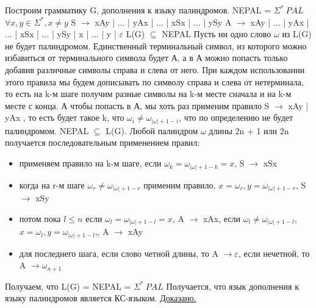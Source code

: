 \documentclass[a4paper,14pt]{article} %
\begin{document}
Построим грамматику G, дополнения к языку палиндромов. NEPAL = $\Sigma^* \ PAL$
$\forall x, y \in \Sigma^*, x \neq y$
\newline
S $\longrightarrow$ xAy | ... | yAx | ... | xSx | ... | ySy
\newline
A $\longrightarrow$ xAy | ... | yAx | ... | xSx | ... | ySy | x | ... | y | $\varepsilon$
\newline
L(G) $\subseteq$ NEPAL
Пусть ни одно слово $\omega$ из L(G) не будет палиндромом. Единственный терминальный символ, из которого можно избавиться от терминального символа будет А, а в А можно попасть только добавив различные символы справа и слева от него.
При каждом использовании этого правила мы будем дописывать по символу справа и слева от нетерминала, то есть на k-м шаге получим разные символы на k-м месте сначала и на k-м месте с конца.
А чтобы попасть в А, мы хоть раз применим правило S $\longrightarrow$ xAy | yAx , то есть будет такое k, что $\omega_i \neq \omega_{|\omega| + 1 - i}$, что по определению не будет палиндромом.
\newline
NEPAL $\subseteq$ L(G).
\newline 
Любой палиндром $\omega$ длины 2n + 1 или 2n получается последовательным применением правил:
\begin{itemize}
    \item применяем правило на k-м шаге, если $\omega_k = \omega_{|\omega| + 1 - k} = x$, S $\longrightarrow$ xSx
    \item когда на r-м шаге $\omega_r \neq \omega_{|\omega| + 1 - r}$ применим правило, $x = \omega_r, y = \omega_{|\omega| + 1 - r}$, S $\longrightarrow$ xSy
    \item потом пока $l \leq n $ если $\omega_l = \omega_{ |\omega| + 1 - l} = x$, A $\longrightarrow$ xAx, если $\omega_l \neq \omega_{|\omega| + 1 - l}$, $x = \omega_l, y = \omega_{|\omega| + 1 - l}$,, A $\longrightarrow$ xAy
    \item для последнего шага, если слово четной длины, то A $\longrightarrow \varepsilon$, если нечетной, то A $\longrightarrow \omega_{n+1}$
\end{itemize}

Получаем, что L(G) = NEPAL = $\Sigma^* \ PAL$
Получается, что язык дополнения к языку палиндромов является КС-языком.
\newline
\underline{Доказано.}
\end{document}
